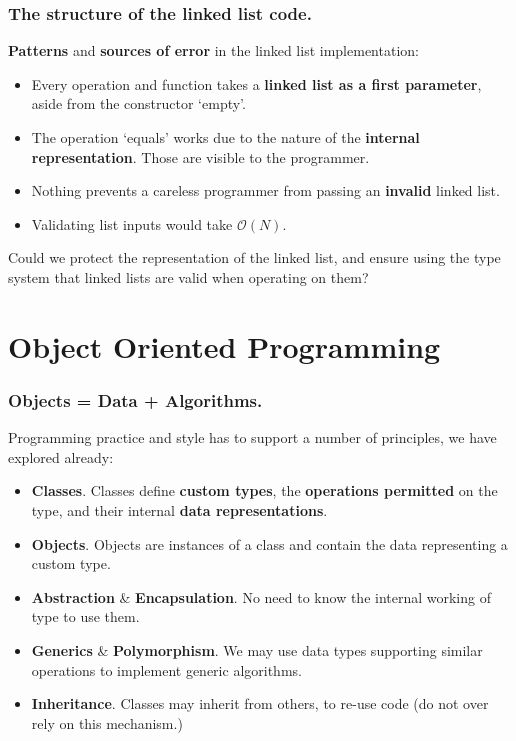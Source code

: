 \documentclass{beamer} %
\newcommand\emc[1]{\textcolor{brightblue}{\textbf{#1}}}
\begin{document}


\begin{frame}
\frametitle{The structure of the linked list code.}

\emc{Patterns} and \emc{sources of error} in the linked list implementation:
\begin{itemize}
  \item Every operation and function takes a \emc{linked list as a first parameter}, aside from the constructor `empty'.
  \item The operation `equals' works due to the nature of the \emc{internal representation}. Those are visible to the programmer.
  \item Nothing prevents a careless programmer from passing an \emc{invalid} linked list.
  \item Validating list inputs would take $\mathcal{O}(N)$.
\end{itemize}

Could we protect the representation of the linked list, and ensure using the type system that linked lists are valid when operating on them?

\end{frame}

\section{Object Oriented Programming}

\begin{frame}
\frametitle{Objects = Data + Algorithms.}

Programming practice and style has to support a number of principles, we have explored already:

\begin{itemize}
  \item \emc{Classes}. Classes define \emc{custom types}, the \emc{operations permitted} on the type, and their  internal \emc{data representations}.
  \item \emc{Objects}. Objects are instances of a class and contain the data representing a custom type.
  \item \emc{Abstraction} \& \emc{Encapsulation}. No need to know the internal working of type to use them.
  \item \emc{Generics} \& \emc{Polymorphism}. We may use data types supporting similar operations to implement generic algorithms. 
  \item \emc{Inheritance}. Classes may inherit from others, to re-use code (do not over rely on this mechanism.)
\end{itemize}

\end{frame}
\end{document}
